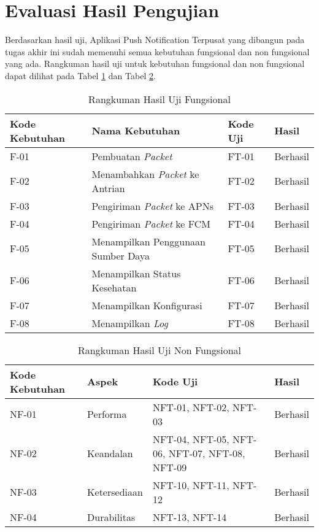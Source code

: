 \section{Evaluasi Hasil Pengujian}
\par Berdasarkan hasil uji, Aplikasi Push Notification Terpusat yang dibangun pada tugas akhir ini sudah memenuhi semua kebutuhan fungsional dan non fungsional yang ada. Rangkuman hasil uji untuk kebutuhan fungsional dan non fungsional dapat dilihat pada Tabel \ref{t:eval_f} dan Tabel \ref{t:eval_nf}.
\begin{longtable}{|p{1.5cm}|p{3cm}|p{1.5cm}|p{1.5cm}|}
	\caption{Rangkuman Hasil Uji Fungsional} \label{t:eval_f} \\ \hline
	\rowcolor{lightgray} Kode Kebutuhan & Nama Kebutuhan & Kode Uji & Hasil \\ \hline
	F-01 & Pembuatan \textit{Packet} & FT-01 & Berhasil \\ \hline
	F-02 & Menambahkan \textit{Packet} ke Antrian & FT-02 & Berhasil \\ \hline
	F-03 & Pengiriman \textit{Packet} ke APNs & FT-03 & Berhasil \\ \hline
	F-04 & Pengiriman \textit{Packet} ke FCM & FT-04 & Berhasil \\ \hline
	F-05 & Menampilkan Penggunaan Sumber Daya & FT-05 & Berhasil \\ \hline
	F-06 & Menampilkan Status Kesehatan & FT-06 & Berhasil \\ \hline
	F-07 & Menampilkan Konfigurasi & FT-07 & Berhasil \\ \hline
	F-08 & Menampilkan \textit{Log} & FT-08 & Berhasil \\ \hline
\end{longtable}
\begin{longtable}{|p{1.5cm}|p{2cm}|p{3cm}|p{1.5cm}|}
	\caption{Rangkuman Hasil Uji Non Fungsional} \label{t:eval_nf} \\ \hline
	\rowcolor{lightgray} Kode Kebutuhan & Aspek & Kode Uji & Hasil \\ \hline
	NF-01 & Performa & NFT-01, NFT-02, NFT-03 & Berhasil \\ \hline
	NF-02 & Keandalan & NFT-04, NFT-05, NFT-06, NFT-07, NFT-08, NFT-09 & Berhasil \\ \hline
	NF-03 & Ketersediaan & NFT-10, NFT-11, NFT-12 & Berhasil \\ \hline
	NF-04 & Durabilitas & NFT-13, NFT-14 & Berhasil \\ \hline
\end{longtable}
